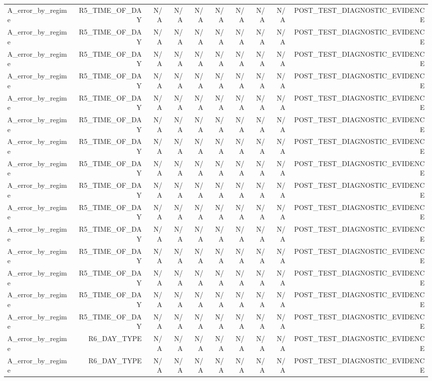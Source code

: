 \begin{table}[h!]
\begin{tabular}{lrrrrrrrrr}
A\_error\_by\_regime & R5\_TIME\_OF\_DAY & N/A & N/A & N/A & N/A & N/A & N/A & N/A & POST\_TEST\_DIAGNOSTIC\_EVIDENCE \\
A\_error\_by\_regime & R5\_TIME\_OF\_DAY & N/A & N/A & N/A & N/A & N/A & N/A & N/A & POST\_TEST\_DIAGNOSTIC\_EVIDENCE \\
A\_error\_by\_regime & R5\_TIME\_OF\_DAY & N/A & N/A & N/A & N/A & N/A & N/A & N/A & POST\_TEST\_DIAGNOSTIC\_EVIDENCE \\
A\_error\_by\_regime & R5\_TIME\_OF\_DAY & N/A & N/A & N/A & N/A & N/A & N/A & N/A & POST\_TEST\_DIAGNOSTIC\_EVIDENCE \\
A\_error\_by\_regime & R5\_TIME\_OF\_DAY & N/A & N/A & N/A & N/A & N/A & N/A & N/A & POST\_TEST\_DIAGNOSTIC\_EVIDENCE \\
A\_error\_by\_regime & R5\_TIME\_OF\_DAY & N/A & N/A & N/A & N/A & N/A & N/A & N/A & POST\_TEST\_DIAGNOSTIC\_EVIDENCE \\
A\_error\_by\_regime & R5\_TIME\_OF\_DAY & N/A & N/A & N/A & N/A & N/A & N/A & N/A & POST\_TEST\_DIAGNOSTIC\_EVIDENCE \\
A\_error\_by\_regime & R5\_TIME\_OF\_DAY & N/A & N/A & N/A & N/A & N/A & N/A & N/A & POST\_TEST\_DIAGNOSTIC\_EVIDENCE \\
A\_error\_by\_regime & R5\_TIME\_OF\_DAY & N/A & N/A & N/A & N/A & N/A & N/A & N/A & POST\_TEST\_DIAGNOSTIC\_EVIDENCE \\
A\_error\_by\_regime & R5\_TIME\_OF\_DAY & N/A & N/A & N/A & N/A & N/A & N/A & N/A & POST\_TEST\_DIAGNOSTIC\_EVIDENCE \\
A\_error\_by\_regime & R5\_TIME\_OF\_DAY & N/A & N/A & N/A & N/A & N/A & N/A & N/A & POST\_TEST\_DIAGNOSTIC\_EVIDENCE \\
A\_error\_by\_regime & R5\_TIME\_OF\_DAY & N/A & N/A & N/A & N/A & N/A & N/A & N/A & POST\_TEST\_DIAGNOSTIC\_EVIDENCE \\
A\_error\_by\_regime & R5\_TIME\_OF\_DAY & N/A & N/A & N/A & N/A & N/A & N/A & N/A & POST\_TEST\_DIAGNOSTIC\_EVIDENCE \\
A\_error\_by\_regime & R5\_TIME\_OF\_DAY & N/A & N/A & N/A & N/A & N/A & N/A & N/A & POST\_TEST\_DIAGNOSTIC\_EVIDENCE \\
A\_error\_by\_regime & R5\_TIME\_OF\_DAY & N/A & N/A & N/A & N/A & N/A & N/A & N/A & POST\_TEST\_DIAGNOSTIC\_EVIDENCE \\
A\_error\_by\_regime & R6\_DAY\_TYPE & N/A & N/A & N/A & N/A & N/A & N/A & N/A & POST\_TEST\_DIAGNOSTIC\_EVIDENCE \\
A\_error\_by\_regime & R6\_DAY\_TYPE & N/A & N/A & N/A & N/A & N/A & N/A & N/A & POST\_TEST\_DIAGNOSTIC\_EVIDENCE \\

\end{tabular}
\end{table}

